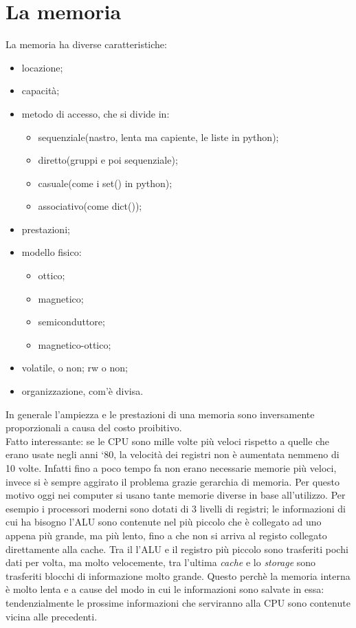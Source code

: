 \documentclass{article}
\begin{document}
\section{La memoria}

La memoria ha diverse caratteristiche:
\begin{itemize}
	\item locazione;
	\item capacità;
	\item metodo di accesso, che si divide in:

	\begin{itemize}
		\item sequenziale(nastro, lenta ma capiente, le liste in python);
		\item diretto(gruppi e poi sequenziale);
		\item casuale(come i set() in python);
		\item associativo(come dict());
	\end{itemize}

	\item prestazioni;
	\item modello fisico:

	\begin{itemize}
		\item ottico;
		\item magnetico;
		\item semiconduttore;
		\item magnetico-ottico;
	\end{itemize}

	\item volatile, o non; rw o non;
	\item organizzazione, com'è divisa.
\end{itemize}

In generale l'ampiezza e le prestazioni di una memoria sono inversamente proporzionali a causa del costo proibitivo. \\
Fatto interessante: se le CPU sono mille volte più veloci rispetto a quelle che erano usate negli anni `80, la velocità dei registri non è aumentata nemmeno di 10 volte. Infatti fino a poco tempo fa non erano necessarie memorie più veloci, invece si è sempre aggirato il problema grazie gerarchia di memoria.
Per questo motivo oggi nei computer si usano tante memorie diverse in base all'utilizzo. Per esempio i processori moderni sono dotati di 3 livelli di registri; le informazioni di cui ha bisogno l'ALU sono contenute nel più piccolo che è collegato ad uno appena più grande, ma più lento, fino a che non si arriva al registo collegato direttamente alla cache. Tra il l'ALU e il registro più piccolo sono trasferiti pochi dati per volta, ma molto velocemente, tra l'ultima \textit{cache} e lo \textit{storage} sono trasferiti blocchi di informazione molto grande. Questo perchè la memoria interna è molto lenta e a cause del modo in cui le informazioni sono salvate in essa: tendenzialmente le prossime informazioni che serviranno alla CPU sono contenute vicina alle precedenti.
\end{document}
